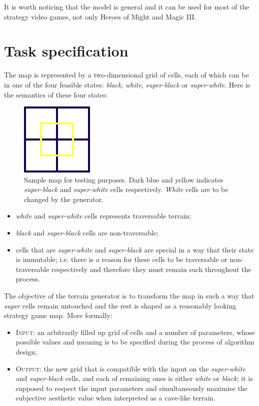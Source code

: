 \documentclass[a4paper, 11pt]{article} %
\begin{document}
It is worth noticing that the model is general and it can be used for most of the strategy video games, not only Heroes of Might and Magic III.


\section*{Task specification}

The map is represented by a two-dimensional grid of cells, each of which can be in one of the four feasible states: \emph{black}, \emph{white}, \emph{super-black} or \emph{super-white}. Here is the semantics of these four states:

\begin{figure}
	\centering
	\includegraphics[scale=1.0]{input}
	\caption{Sample map for testing purposes. Dark blue and yellow indicates \emph{super-black} and \emph{super-white} cells respectively. \emph{White} cells are to be changed by the generator.}
	\label{fig:input}
\end{figure}

\begin{itemize}
	\item \emph{white} and \emph{super-white} cells represents traversable terrain;
	\item \emph{black} and \emph{super-black} cells are non-traversable;
	\item cells that are \emph{super-white} and \emph{super-black} are special in a way that their state is immutable; i.e. there is a reason for these cells to be traversable or non-traversable respectively and therefore they must remain such throughout the process.
\end{itemize}

The objective of the terrain generator is to transform the map in such a way that \emph{super} cells remain untouched and the rest is shaped as a reasonably looking strategy game map. More formally:

\begin{itemize}
	\item \textsc{Input:} an arbitrarily filled up grid of cells and a number of parameters, whose possible values and meaning is to be specified during the process of algorithm design;
	\item \textsc{Output:} the new grid that is compatible with the input on the \emph{super-white} and \emph{super-black} cells, and each of remaining ones is either \emph{white} or \emph{black}; it is supposed to respect the input parameters and simultaneously maximise the subjective aesthetic value when interpreted as a cave-like terrain.
\end{itemize}
\end{document}
